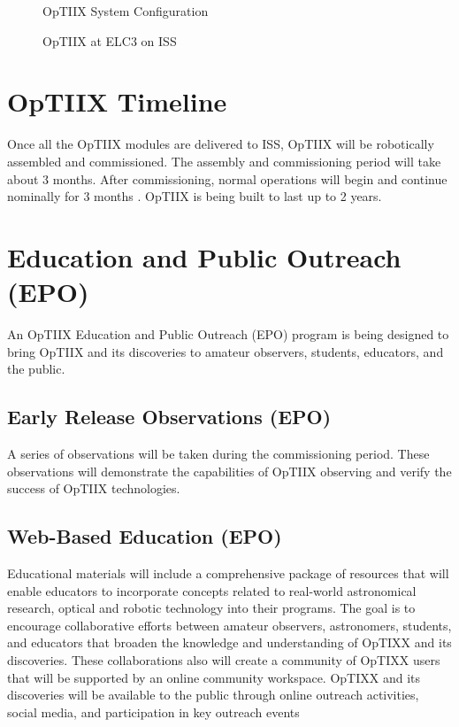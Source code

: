 \begin{figure}[ht!]
\caption{OpTIIX System Configuration}
\end{figure}

\begin{figure}[ht!]
\caption{OpTIIX at ELC3 on ISS}
\end{figure}

\section{OpTIIX Timeline}
Once all the OpTIIX modules are delivered to ISS, OpTIIX will be robotically assembled and commissioned.  The assembly and commissioning period will take about 3 months.  After commissioning, normal operations will begin and continue nominally for 3 months .  OpTIIX is being built to last up to 2 years.

\section{Education and Public Outreach (EPO)}
An OpTIIX Education and Public Outreach (EPO) program is being designed to bring OpTIIX and its discoveries to amateur observers, students, educators, and the public.

\subsection{Early Release Observations (EPO)}
A series of observations will be taken during the commissioning period.   These observations will demonstrate the capabilities of OpTIIX observing and verify the success of OpTIIX technologies.

\subsection{Web-Based Education (EPO)}
Educational materials will include a comprehensive package of resources that will enable educators to incorporate concepts related to real-world astronomical research, optical and robotic technology into their programs. The goal is to encourage collaborative efforts between amateur observers, astronomers, students, and educators that broaden the knowledge and understanding of OpTIXX and its discoveries. These collaborations also will create a community of OpTIXX users that will be supported by an online community workspace. OpTIXX and its discoveries will be available to the public through online outreach activities, social media, and participation in key outreach events

